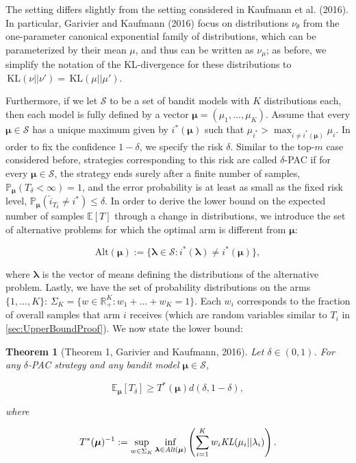 \documentclass[11pt,]{article}
\newtheorem{theorem}{Theorem}
\newcommand{\KL}{\,\text{KL}}
\begin{document}
The setting differs slightly from the setting considered in Kaufmann et
al. (2016). In particular, Garivier and Kaufmann (2016) focus on
distributions \(\nu_{\theta}\) from the one-parameter canonical
exponential family of distributions, which can be parameterized by their
mean \(\mu\), and thus can be written as \(\nu_{\mu}\); as before, we
simplify the notation of the KL-divergence for these distributions to
\(\KL(\nu || \nu') = \KL(\mu || \mu')\).

Furthermore, if we let \(\mathcal{S}\) to be a set of bandit models with
\(K\) distributions each, then each model is fully defined by a vector
\(\bm{\mu} = (\mu_1, \dots, \mu_K)\). Assume that every
\(\bm{\mu} \in \mathcal{S}\) has a unique maximum given by
\(i^*(\bm{\mu})\) such that
\(\mu_{i^*} > \max_{i \neq i^*(\bm{\mu})} \mu_i\). In order to fix the
confidence \(1-\delta\), we specify the risk \(\delta\). Similar to the
top-\(m\) case considered before, strategies corresponding to this risk
are called \(\delta\)-PAC if for every \(\bm{\mu} \in \mathcal{S}\), the
strategy ends surely after a finite number of samples,
\(\mathbb{P}_{\bm{\mu}}(T_{\delta} < \infty) = 1\), and the error
probability is at least as small as the fixed risk level,
\(\mathbb{P}_{\bm{\mu}}(\hat{i}_{T_{\delta}} \neq i^*) \leq \delta\). In
order to derive the lower bound on the expected number of samples
\(\mathbb{E}[T]\) through a change in distributions, we introduce the
set of alternative problems for which the optimal arm is different from
\(\bm{\mu}\):

\begin{equation*}
\text{Alt}(\bm{\mu}) := \{\bm{\lambda} \in \mathcal{S}: i^*(\bm{\lambda}) \neq i^*(\bm{\mu})\},
\end{equation*}

where \(\bm{\lambda}\) is the vector of means defining the distributions
of the alternative problem. Lastly, we have the set of probability
distributions on the arms \(\{1,...,K\}\):
\(\Sigma_K = \{w \in \mathbb{R}_{+}^K: w_1 + \dots + w_K = 1\}\). Each
\(w_i\) corresponds to the fraction of overall samples that arm \(i\)
receives (which are random variables similar to \(T_i\) in
\autoref{sec:UpperBoundProof}). We now state the lower bound:

\begin{theorem}[Theorem 1, Garivier and Kaufmann, 2016] \label{theorem:GarivierKaufmannTheorem1}
Let $\delta \in (0,1)$. For any $\delta$-PAC strategy and any bandit model $\bm{\mu} \in \mathcal{S}$,

\begin{equation*}
\mathbb{E}_{\bm{\mu}} [T_{\delta}] \geq T^*(\bm{\mu}) d(\delta,1-\delta),
\end{equation*}

where 

\begin{equation} \label{eq:GarivierKaufmann_Theorem1_Game}
T^*(\bm{\mu})^{-1} := \sup_{w \in \Sigma_K} \inf_{\bm{\lambda} \in \text{\em{Alt}}(\bm{\mu})} \left( \sum_{i=1}^K w_i \text{\em{KL}}(\mu_i|| \lambda_i)\right).
\end{equation}
\end{theorem}
\end{document}
